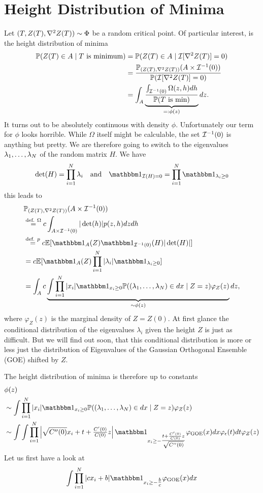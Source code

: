 \section{Height Distribution of Minima}

Let \((T,Z(T),\nabla^2Z(T))\sim\Phi\) be a random critical point.
Of particular interest, is the height distribution of minima
\[\begin{aligned}
	\mathbb{P}(Z(T)\in A \mid T\text{ is minimum})
	&=\mathbb{P}(Z(T)\in A \mid \mathcal{I}[\nabla^2Z(T)]=0)\\
	&= \frac{\mathbb{P}_{(Z(T), \nabla^2Z(T))}(A\times \mathcal{I}^{-1}(0))}{\mathbb{P}(\mathcal{I}[\nabla^2Z(T)]=0)}\\
	&= \int_A \underbrace{
		\frac{\int_{\mathcal{I}^{-1}(0)} \Omega(z,h) dh}{\mathbb{P}(T\text{ is min})}
	}_{=: \phi(z)} dz.
\end{aligned}\]
It turns out to be absolutely continuous with density \(\phi\). Unfortunately
our term for \(\phi\) looks horrible. While \(\Omega\) itself might be
calculable, the set \(\mathcal{I}^{-1}(0)\) is anything but pretty. We are therefore
going to switch to the eigenvalues \(\lambda_1,\dots,\lambda_N\) of
the random matrix \(H\). We have
\[
	\det(H) = \prod_{i=1}^\dimension \lambda_i
	\quad\text{and}\quad
	\ind_{\negEV(H) = 0} = \prod_{i=1}^\dimension \ind_{\lambda_i\ge 0}
\]
this leads to 
\[\begin{aligned}
	&\Pr_{(\rf(T), \nabla^2\rf(T))}(A\times \negEV^{-1}(0))\\
	&\overset{\text{def. }\Omega}= c\int_{A\times\negEV^{-1}(0)} |\det(h)| p(z,h)dz dh\\
	&\overset{\text{def. } p}= c\E[\ind_{A}(Z)\ind_{\negEV^{-1}(0)}(H)|\det(H)|]\\
	&= c\E[\ind_{A}(Z)\prod_{i=1}^\dimension |\lambda_i| \ind_{\lambda_i \ge 0}]\\
	&= \int_A c\underbrace{
		\int \prod_{i=1}^\dimension |x_i| \ind_{x_i\ge 0}
		\Pr((\lambda_1,\dots,\lambda_\dimension)\in dx\mid Z=z) \varphi_Z(z)
	}_{\sim\phi(z)}
	dz,
\end{aligned}\]
where \(\varphi_Z(z)\) is the marginal density of \(Z=Z(0)\). At first glance
the conditional distribution of the eigenvalues \(\lambda_i\) given the
height \(Z\) is just as difficult. But we will find out soon, that this
conditional distribution is more or less just the distribution of Eigenvalues of
the Gaussian Orthogonal Ensemble (GOE) shifted by \(Z\).

The height distribution
of minima is therefore up to constants
\[\begin{aligned}
	&\phi(z)\\
	&\sim\int \prod_{i=1}^\dimension |x_i| \ind_{x_i\ge 0}
	\Pr((\lambda_1,\dots,\lambda_\dimension)\in dx\mid Z=z) \varphi_Z(z)\\
	&\sim\int \int \prod_{i=1}^\dimension
	\left|\sqrt{\sqC''(0)}x_i + t + \tfrac{\sqC'(0)}{\sqC(0)}z\right|
	\ind_{x_i\ge - \tfrac{t+\frac{\sqC'(0)}{\sqC(0)}z}{\sqrt{\sqC''(0)}}}
	\varphi_{\text{GOE}}(x) dx \varphi_\epsilon(t)dt \varphi_Z(z)\\
\end{aligned}\]
Let us first have a look at
\[
	\int\prod_{i=1}^\dimension |c x_i + b| \ind_{x_i \ge -\tfrac{b}{c}}\varphi_{\text{GOE}}(x)dx
\]